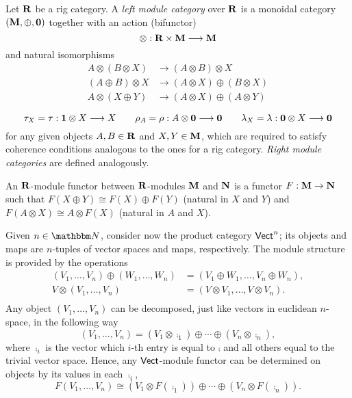 \begin{defi}
Let ${\bf R}$ be a rig category. A \emph{left module category} over
${\bf R}$ is a monoidal category $({\bf M}, \oplus , {\bf 0})$ together
with an action (bifunctor) 
$$
\otimes :{\bf R}\times {\bf M}\longrightarrow {\bf M}
$$
and natural isomorphisms
$$
\begin{aligned}
  A\otimes (B\otimes X) &\longrightarrow (A\otimes B)\otimes
  X \\
  (A\oplus B)\otimes X &\longrightarrow (A\otimes X)\oplus
  (B\otimes X) \\
  A\otimes (X\oplus Y) &\longrightarrow (A\otimes X)\oplus
  (A\otimes Y) \\
\end{aligned}
$$
$$\tau_X = \tau :{\bf 1}\otimes X\longrightarrow X \qquad \rho_A=\rho
:A\otimes {\bf 0}\longrightarrow {\bf 0} \qquad \lambda_X=\lambda :{\bf
0}\otimes X\longrightarrow {\bf 0}$$ 
for any given objects $A,B\in {\bf R}$ and $X,Y\in {\bf M}$, which are
required to satisfy coherence conditions analogous to the ones for a
rig category. \emph{Right module categories} are defined
analogously.
\end{defi}

An ${\bf R}$-module functor between ${\bf R}$-modules ${\bf M}$ and ${\bf N}$ is a functor $F:{\bf M}\to {\bf N}$ such that $F(X\oplus Y)\cong F(X)\oplus F(Y)$ (natural in $X$ and $Y$) and $F(A\otimes X)\cong A\otimes F(X)$ (natural in $A$ and $X$).

Given $n\in \natu$, consider now the product category $\mathsf{Vect}^n$; its objects and maps are $n$-tuples of vector spaces and maps, respectively. The module structure is provided by the operations
$$
\begin{aligned}
(V_1,\dots ,V_n)\oplus (W_1,\dots ,W_n) &= (V_1\oplus W_1,\dots ,V_n\oplus W_n), \\
V\otimes (V_1,\dots ,V_n) &= (V\otimes V_1,\dots ,V\otimes V_n).\\
\end{aligned}
$$
Any object $(V_1,\dots ,V_n)$ can be decomposed, just like vectors in euclidean $n$-space, in the following way
$$(V_1,\dots ,V_n)=(V_1\otimes \comp_1)\oplus \cdots \oplus (V_n\otimes \comp_n),$$
where $\comp_i$ is the vector which $i$-th entry is equal to $\comp$ and all others equal to the trivial vector space. Hence, any $\mathsf{Vect}$-module functor can be determined on objects by its values in each $\comp_i$,
\begin{equation}\label{module_functor}
F(V_1,\dots ,V_n)\cong (V_1\otimes F(\comp_1))\oplus \cdots \oplus (V_n\otimes F(\comp_n)).
\end{equation}


